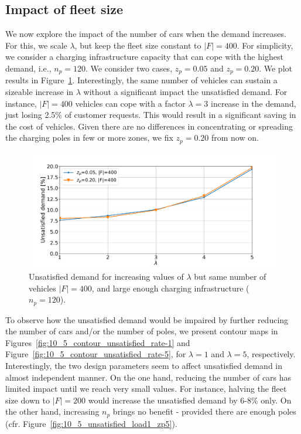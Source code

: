 \subsection{Impact of fleet size}
We now explore the impact of the number of cars when the demand increases. For this, we scale $\lambda$, but keep the fleet size constant to $|F|=400$. For simplicity, we consider a  charging infrastructure capacity that can cope with the highest demand, i.e., $n_p=120$. We consider two cases, $z_p=0.05$ and $z_p=0.20$. We plot results in Figure~\ref{fig:10_5_unsatisfied_zp_fixed_request}.
Interestingly, the same number of vehicles can sustain a sizeable increase in $\lambda$ without a significant impact the unsatisfied demand. 
For instance, $|F|=400$ vehicles can cope with a factor $\lambda=3$ increase in the demand, just losing 2.5\% of customer requests. This would result in a significant saving in the cost of vehicles. Given there are no differences in concentrating or spreading the charging poles in few or more zones, we fix $z_p=0.20$ from now on.

\begin{figure}
\centering
\includegraphics[width=1.\linewidth]{fig/final/const_fleet_zp.pdf}
\caption{Unsatisfied demand for increasing values of $\lambda$ but same number of vehicles $|F|=400$, and large enough charging infrastructure ($n_p=120$).}
\label{fig:10_5_unsatisfied_zp_fixed_request}
\end{figure}

To observe how the unsatisfied demand would be impaired by further reducing the number of cars and/or the number of poles, we present contour maps in Figures~\ref{fig:10_5_contour_unsatisfied_rate-1} and Figure~\ref{fig:10_5_contour_unsatisfied_rate-5}, for $\lambda=1$ and $\lambda=5$, respectively. 
Interestingly, the two design parameters seem to affect unsatisfied demand in almost independent manner. On the one hand, reducing the number of cars has limited impact until we reach very small values. For instance, halving the fleet size down to $|F|=200$ would increase the unsatisfied demand by 6-8\% only.
On the other hand, increasing $n_p$ brings no benefit - provided there are enough poles (cfr. Figure~\ref{fig:10_5_unsatisfied_load1_zp5}).


